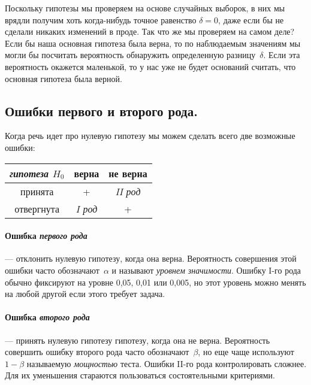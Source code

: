 \documentclass[../handbook.tex]{subfiles}
\begin{document}
Поскольку гипотезы мы проверяем на основе случайных выборок, в них мы врядли
получим хоть когда-нибудь точное равенство $\delta = 0$, даже если бы не
сделали никаких изменений в проде. Так что же мы проверяем на самом деле? Если
бы наша основная гипотеза была верна, то по наблюдаемым значениям мы могли
бы посчитать вероятность обнаружить определенную разницу~$\delta$. Если эта
вероятность окажется маленькой, то у нас уже не будет оснований считать, что
основная гипотеза была верной.


\subsection{Ошибки первого и второго рода.} 
Когда речь идет про нулевую гипотезу мы можем сделать всего две возможные
ошибки:
\begin{margintable}
    \label{tab:mistakes}
    \begin{center}
        \begin{tabular}[c]{c|c c}
            {\it гипотеза $H_0$} & верна & не верна \\
            \hline
            принята & + & {\it II род} \\
            отвергнута & {\it I род} & + \\
        \end{tabular}
    \end{center}
\end{margintable}
        
\paragraph{Ошибка \emph{первого рода}} --- отклонить нулевую гипотезу, когда
она верна. Вероятность совершения этой ошибки часто обозначают~$\alpha$ и
называют \emph{уровнем значимости}. Ошибку I-го рода обычно фиксируют на уровне
0,05, 0,01 или 0,005, но этот уровень можно менять на любой другой если этого
требует задача.

\paragraph{Ошибка \emph{второго рода}}
--- принять нулевую гипотезу гипотезу,
когда она не верна. Вероятность совершить ошибку второго рода часто
обозначают~$\beta$, но еще чаще используют $1 - \beta$ называемую
\emph{мощностью} теста. Ошибки II-го рода контролировать сложнее. Для их
уменьшения стараются пользоваться состоятельными критериями.
\end{document}

